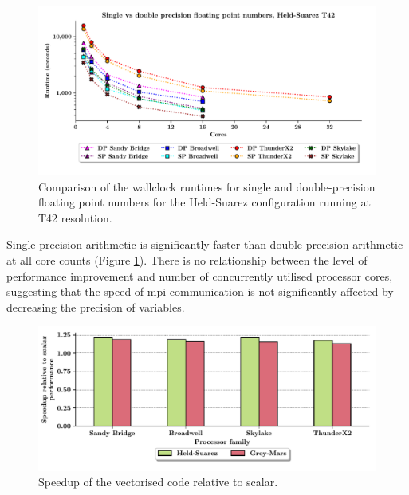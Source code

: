 \documentclass[a4paper,11pt]{report}
\begin{document}
\par
\begin{figure}[H]
\begin{center}
\includegraphics[width=1\textwidth]{img/single-double-precision.pdf}
\caption[Performance comparison of varied precision of floating point numbers]{Comparison of the wallclock runtimes for single and double-precision floating point numbers for the Held-Suarez configuration running at T42 resolution. }
\label{fig:precision}
\end{center}
\end{figure}
\par
Single-precision arithmetic is significantly faster than double-precision arithmetic at all core counts (Figure \ref{fig:precision}). There is no relationship between the level of performance improvement and number of concurrently utilised processor cores, suggesting that the speed of \gls{mpi} communication is not significantly affected by decreasing the precision of variables.
\par
\begin{figure}[htbp]
\begin{center}
\includegraphics[width=\textwidth]{img/speedup-vector-sp.pdf}
\caption{Speedup of the vectorised code relative to scalar.}
\label{fig:vec-speed-sp}
\end{center}
\end{figure}
\end{document}
